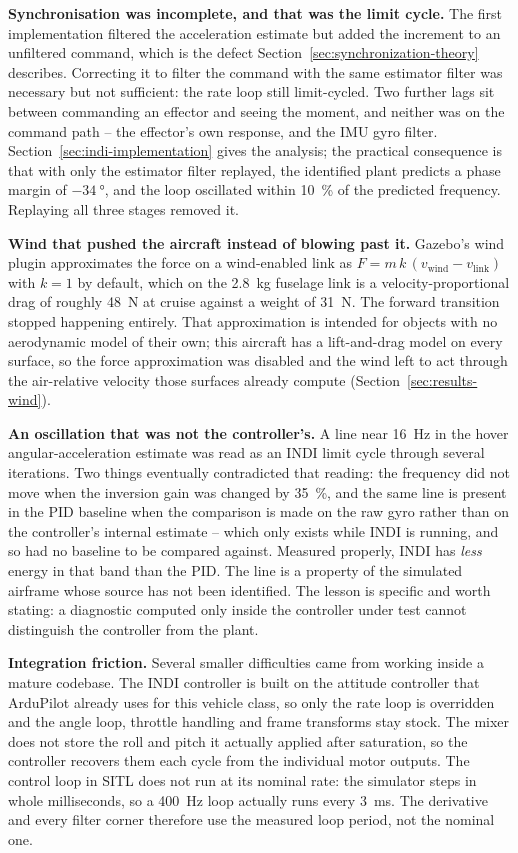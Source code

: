 \documentclass{article}
\begin{document}
\textbf{Synchronisation was incomplete, and that was the limit cycle.} The first implementation filtered the acceleration estimate but added the increment to an unfiltered command, which is the defect Section~\ref{sec:synchronization-theory} describes. Correcting it to filter the command with the same estimator filter was necessary but not sufficient: the rate loop still limit-cycled. Two further lags sit between commanding an effector and seeing the moment, and neither was on the command path -- the effector's own response, and the IMU gyro filter. Section~\ref{sec:indi-implementation} gives the analysis; the practical consequence is that with only the estimator filter replayed, the identified plant predicts a phase margin of $-\SI{34}{\degree}$, and the loop oscillated within \SI{10}{\percent} of the predicted frequency. Replaying all three stages removed it.

\textbf{Wind that pushed the aircraft instead of blowing past it.} Gazebo's wind plugin approximates the force on a wind-enabled link as $F = m\,k\,(v_{\mathrm{wind}} - v_{\mathrm{link}})$ with $k=1$ by default, which on the \SI{2.8}{\kilogram} fuselage link is a velocity-proportional drag of roughly \SI{48}{\newton} at cruise against a weight of \SI{31}{\newton}. The forward transition stopped happening entirely. That approximation is intended for objects with no aerodynamic model of their own; this aircraft has a lift-and-drag model on every surface, so the force approximation was disabled and the wind left to act through the air-relative velocity those surfaces already compute (Section~\ref{sec:results-wind}).

\textbf{An oscillation that was not the controller's.} A line near \SI{16}{\hertz} in the hover angular-acceleration estimate was read as an INDI limit cycle through several iterations. Two things eventually contradicted that reading: the frequency did not move when the inversion gain was changed by \SI{35}{\percent}, and the same line is present in the PID baseline when the comparison is made on the raw gyro rather than on the controller's internal estimate -- which only exists while INDI is running, and so had no baseline to be compared against. Measured properly, INDI has \emph{less} energy in that band than the PID. The line is a property of the simulated airframe whose source has not been identified. The lesson is specific and worth stating: a diagnostic computed only inside the controller under test cannot distinguish the controller from the plant.

\textbf{Integration friction.} Several smaller difficulties came from working inside a mature codebase. The INDI controller is built on the attitude controller that ArduPilot already uses for this vehicle class, so only the rate loop is overridden and the angle loop, throttle handling and frame transforms stay stock. The mixer does not store the roll and pitch it actually applied after saturation, so the controller recovers them each cycle from the individual motor outputs. The control loop in SITL does not run at its nominal rate: the simulator steps in whole milliseconds, so a \SI{400}{\hertz} loop actually runs every \SI{3}{\milli\second}. The derivative and every filter corner therefore use the measured loop period, not the nominal one.
\end{document}
